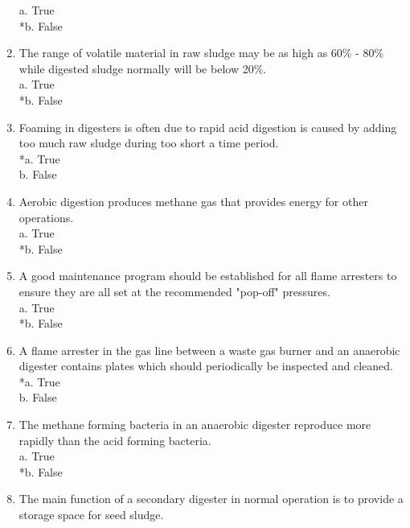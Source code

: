 \documentclass{article}
\begin{document}
\begin{enumerate}
a. True \\
*b. False \\

\item  The range of volatile material in raw sludge may be as high as 60\% - 80\% while digested sludge normally will be below 20\%. \\

a. True \\
*b. False \\

\item  Foaming in digesters is often due to rapid acid digestion is caused by adding too much raw sludge during too short a time period. \\

*a. True \\
b. False \\

\item  Aerobic digestion produces methane gas that provides energy for other operations. \\

a. True \\
*b. False \\

\item  A good maintenance program should be established for all flame arresters to ensure they are all set at the recommended "pop-off" pressures. \\

a. True \\
*b. False \\

\item  A flame arrester in the gas line between a waste gas burner and an anaerobic digester contains plates which should periodically be inspected and cleaned. \\

*a. True \\
b. False \\

\item  The methane forming bacteria in an anaerobic digester reproduce more rapidly than the acid forming bacteria. \\

a. True \\
*b. False \\

\item  The main function of a secondary digester in normal operation is to provide a storage space for seed sludge. \\


\end{enumerate}
\end{document}
